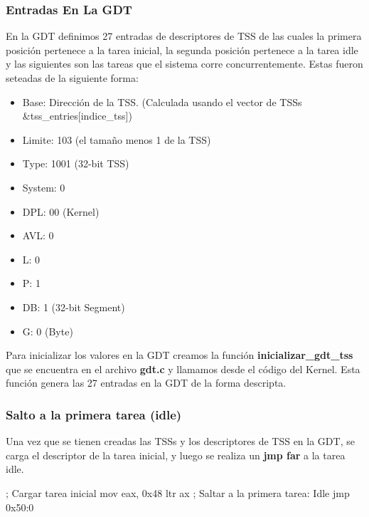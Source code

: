 \subsubsection{Entradas En La GDT}

En la GDT definimos 27 entradas de descriptores de TSS de las cuales la primera posición pertenece a la tarea inicial, la segunda posición pertenece a la tarea idle y las siguientes son las tareas que el sistema corre concurrentemente.
Estas fueron seteadas de la siguiente forma:

\begin{itemize}
	\item Base: Dirección de la TSS. (Calculada usando el vector de TSSs \&tss_entries[indice_tss])
	\item Limite: 103 (el tamaño menos 1 de la TSS)
	\item Type: 1001 (32-bit TSS)
	\item System: 0
	\item DPL: 00 (Kernel)
	\item AVL: 0
	\item L: 0
	\item P: 1
	\item DB: 1 (32-bit Segment)
	\item G: 0 (Byte)
\end{itemize}

Para inicializar los valores en la GDT creamos la función \textbf{inicializar_gdt_tss} que se encuentra en el archivo \textbf{gdt.c} y llamamos desde el código del Kernel. Esta función genera las 27 entradas en la GDT de la forma descripta.

\subsubsection{Salto a la primera tarea (idle)}

Una vez que se tienen creadas las TSSs y los descriptores de TSS en la GDT, se carga el descriptor de la tarea inicial, y luego se realiza un \textbf{jmp far} a la tarea idle.

\begin{algorithm}
		\begin{algorithmic}[H]
			\State ; Cargar tarea inicial
			\State mov eax, 0x48
			\State ltr ax
			\State
			\State ; Saltar a la primera tarea: Idle
			\State jmp 0x50:0
		\end{algorithmic}
\end{algorithm}